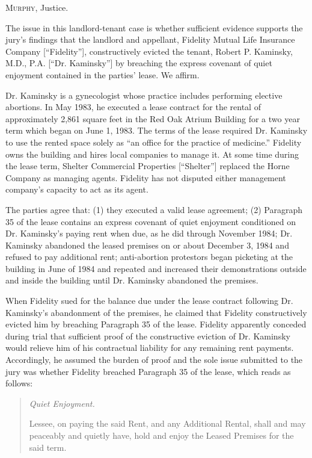 

\opinion \textsc{Murphy}, Justice.

The issue in this landlord-tenant case is whether sufficient evidence supports
the jury's findings that the landlord and appellant, Fidelity Mutual Life
Insurance Company [``Fidelity''], constructively evicted the tenant, Robert P.
Kaminsky, M.D., P.A. [``Dr. Kaminsky''] by breaching the express covenant of
quiet enjoyment contained in the parties' lease. We affirm.

Dr. Kaminsky is a gynecologist whose practice includes performing elective
abortions. In May 1983, he executed a lease contract for the rental of
approximately 2,861 square feet in the Red Oak Atrium Building for a two year
term which began on June 1, 1983. The terms of the lease required Dr. Kaminsky
to use the rented space solely as ``an office for the practice of medicine.''
Fidelity owns the building and hires local companies to manage it. At some time
during the lease term, Shelter Commercial Properties [``Shelter''] replaced the
Horne Company as managing agents. Fidelity has not disputed either management
company's capacity to act as its agent.

The parties agree that: (1) they executed a valid lease agreement; (2) Paragraph
35 of the lease contains an express covenant of quiet enjoyment conditioned on
Dr. Kaminsky's paying rent when due, as he did through November 1984; Dr.
Kaminsky abandoned the leased premises on or about December 3, 1984 and refused
to pay additional rent; anti-abortion protestors began picketing at the
building in June of 1984 and repeated and increased their demonstrations
outside and inside the building until Dr. Kaminsky abandoned the premises.

When Fidelity sued for the balance due under the lease contract following Dr.
Kaminsky's abandonment of the premises, he claimed that Fidelity constructively
evicted him by breaching Paragraph 35 of the lease. Fidelity apparently
conceded during trial that sufficient proof of the constructive eviction of Dr.
Kaminsky would relieve him of his contractual liability for any remaining rent
payments. Accordingly, he assumed the burden of proof and the sole issue
submitted to the jury was whether Fidelity breached Paragraph 35 of the lease,
which reads as follows:

\begin{quote}

\emph{Quiet Enjoyment.}

Lessee, on paying the said Rent, and any Additional Rental, shall and may
peaceably and quietly have, hold and enjoy the Leased Premises for the said
term.
\end{quote}

